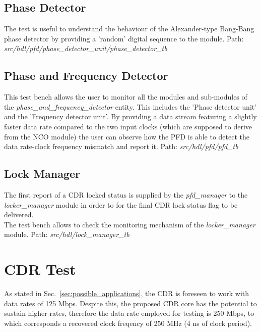 \documentclass[11pt]{article}
\renewcommand{\>}{\rangle} \renewcommand{\emptyset}{\varnothing}
\begin{document}
\subsection{Phase Detector}
The test is useful to understand the behaviour of the Alexander-type Bang-Bang
phase detector by providing a 'random' digital sequence to the module.\bigbreak
Path: \textit{src/hdl/pfd/phase\_detector\_unit/phase\_detector\_tb}

\subsection{Phase and Frequency Detector}
This test bench allows the user to monitor all the modules and sub-modules of
the \textit{phase\_and\_frequency\_detector} entity. This includes the 'Phase
detector unit' and the 'Frequency detector unit'. By providing a data stream
featuring a slightly faster data rate compared to the two input clocks (which
are supposed to derive from the NCO module) the user can observe how the PFD is
able to detect the data rate-clock frequency mismatch and report it.\bigbreak
Path: \textit{src/hdl/pfd/pfd\_tb}

\subsection{Lock Manager}
The first report of a CDR locked status is supplied by the \textit{pfd\_manager}
to the \textit{locker\_manager} module in order to for the final CDR lock status
flag to be delivered.\\
The test bench allows to check the monitoring mechanism of the
\textit{locker\_manager} module. \bigbreak Path:
\textit{src/hdl/lock\_manager\_tb}

\section{CDR Test} \label{sec:cdr_test} As stated in
Sec.~\ref{sec:possible_applications}, the CDR is foreseen to work with data
rates of 125 Mbps. Despite this, the proposed CDR core has the potential to
sustain higher rates, therefore the data rate employed for testing is 250 Mbps,
to which corresponds a recovered clock freqency of 250 MHz (4 ns of clock
period).
\end{document}
